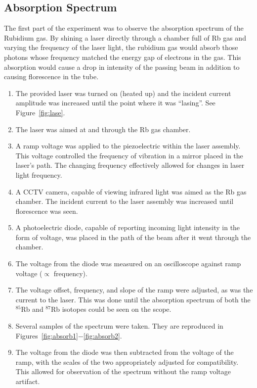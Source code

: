 \documentclass[paper=a4, fontsize=11pt]{scrartcl} %
\numberwithin{equation}{section}
\numberwithin{figure}{section}
\numberwithin{table}{section}
\begin{document}
\subsection{Absorption Spectrum}
The first part of the experiment was to observe the absorption spectrum of the Rubidium gas. By shining a laser directly through a chamber full of Rb gas and varying the frequency of the laser light, the rubidium gas would absorb those photons whose frequency matched the energy gap of electrons in the gas. This absorption would cause a drop in intensity of the passing beam in addition to causing florescence in the tube.

\begin{enumerate}
\item The provided laser was turned on (heated up) and the incident current amplitude was increased until the point where it was ``lasing''. See Figure~\ref{fig:lase}.
\item The laser was aimed at and through the Rb gas chamber.
\item A ramp voltage was applied to the piezoelectric within the laser assembly. This voltage controlled the frequency of vibration in a mirror placed in the laser's path. The changing frequency effectively allowed for changes in laser light frequency.
\item A CCTV camera, capable of viewing infrared light was aimed as the Rb gas chamber. The incident current to the laser assembly was increased until florescence was seen.
\item A photoelectric diode, capable of reporting incoming light intensity in the form of voltage, was placed in the path of the beam after it went through the chamber.
\item The voltage from the diode was measured on an oscilloscope against ramp voltage ($\propto$ frequency).
\item The voltage offset, frequency, and slope of the ramp were adjusted, as was the current to the laser. This was done until the absorption spectrum of both the $^{85}$Rb and $^{87}$Rb isotopes could be seen on the scope.
\item Several samples of the spectrum were taken. They are reproduced in Figures~\ref{fig:absorb1}$-$\ref{fig:absorb2}.
\item The voltage from the diode was then subtracted from the voltage of the ramp, with the scales of the two appropriately adjusted for compatibility. This allowed for observation of the spectrum without the ramp voltage artifact.
\end{enumerate}
\end{document}
